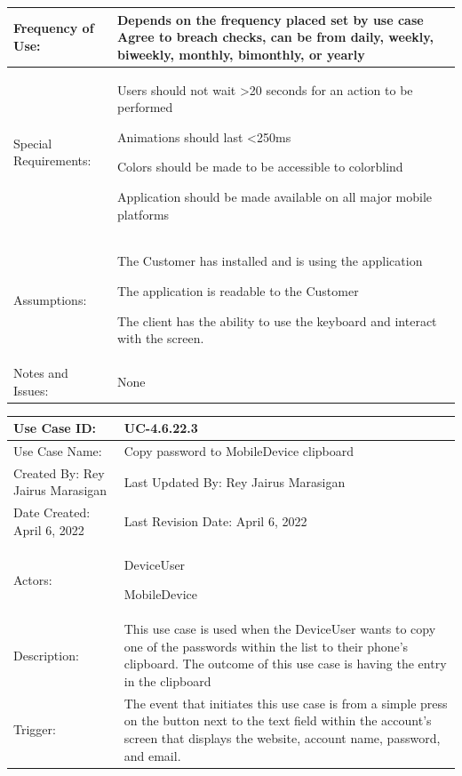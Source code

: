 \documentclass[stu]{apa7}
\newcommand{\nextitem}{\par\hspace*{\labelsep}\textbullet\hspace*{\labelsep}}
\begin{document}
{{{\begin{xltabular}{\textwidth}{|l|X|}
  Frequency of Use: & Depends on the frequency placed set by use case Agree to breach checks, can be from daily, weekly, biweekly, monthly, bimonthly, or yearly \\ \hline

  Special Requirements: & \nextitem Users should not wait >20 seconds for an action to be performed
                          \nextitem Animations should last <250ms
                          \nextitem Colors should be made to be accessible to colorblind
                          \nextitem Application should be made available on all major mobile platforms \\ \hline
              Assumptions: &
                             \nextitem The Customer has installed and is using the application
                             \nextitem The application is readable to the Customer
                             \nextitem The client has the ability to use the keyboard and interact with the screen. \\ \hline

  Notes and Issues: & None \\ \hline

\end{xltabular}

\scriptsize{\begin{xltabular}{\textwidth}{|l|X|}
              \hline Use Case ID: & UC-4.6.22.3 \\ \hline

              Use Case Name:  & Copy password to MobileDevice clipboard \\ \hline

              Created By: Rey Jairus Marasigan & Last Updated By: Rey Jairus Marasigan \\ \hline

              Date Created: April 6, 2022 & Last Revision Date: April 6, 2022 \\ \hline

              Actors: & \nextitem DeviceUser \nextitem MobileDevice \\ \hline

              Description: & This use case is used when the DeviceUser wants to copy one of the passwords within the list to their phone’s clipboard. The outcome of this use case is having the entry in the clipboard \\ \hline

              Trigger: & The event that initiates this use case is from a simple press on the button next to the text field within the account’s screen that displays the website, account name, password, and email. \\ \hline


\end{xltabular}}}}}
\end{document}
